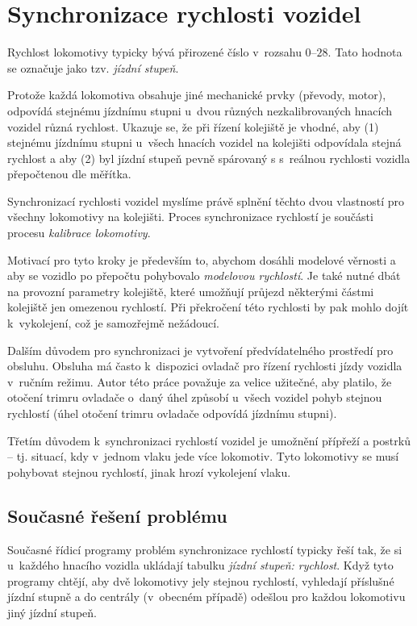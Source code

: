 \section{Synchronizace rychlosti vozidel}
\label{sec:sync-rych}

Rychlost lokomotivy typicky bývá přirozené číslo v~rozsahu $0$--$28$. Tato
hodnota se označuje jako tzv. \textit{jízdní stupeň}.

Protože každá lokomotiva obsahuje jiné mechanické prvky (převody, motor),
odpovídá stejnému jízdnímu stupni u~dvou různých nezkalibrovaných hnacích
vozidel různá rychlost. Ukazuje se, že při řízení kolejiště je vhodné, aby (1)
stejnému jízdnímu stupni u~všech hnacích vozidel na kolejišti odpovídala stejná
rychlost a aby (2) byl jízdní stupeň pevně spárovaný s s~reálnou rychlosti
vozidla přepočtenou dle měřítka.

Synchronizací rychlosti vozidel myslíme právě splnění těchto dvou vlastností
pro všechny lokomotivy na kolejišti. Proces synchronizace rychlostí je součásti
procesu \textit{kalibrace lokomotivy}.

Motivací pro tyto kroky je především to, abychom dosáhli modelové věrnosti a
aby se vozidlo po přepočtu pohybovalo \textit{modelovou rychlostí}. Je také
nutné dbát na provozní parametry kolejiště, které umožňují průjezd některými
částmi kolejiště jen omezenou rychlostí. Při překročení této rychlosti by pak
mohlo dojít k~vykolejení, což je samozřejmě nežádoucí.

Dalším důvodem pro synchronizaci je vytvoření předvídatelného prostředí pro
obsluhu. Obsluha má často k~dispozici ovladač pro řízení rychlosti jízdy
vozidla v~ručním režimu. Autor této práce považuje za velice užitečné, aby
platilo, že otočení trimru ovladače o~daný úhel způsobí u~všech vozidel pohyb
stejnou rychlostí (úhel otočení trimru ovladače odpovídá jízdnímu stupni).

Třetím důvodem k~synchronizaci rychlostí vozidel je umožnění přípřeží a postrků
-- tj.  situací, kdy v~jednom vlaku jede více lokomotiv. Tyto lokomotivy se
musí pohybovat stejnou rychlostí, jinak hrozí vykolejení vlaku.

\subsection{Současné řešení problému}

Současné řídicí programy problém synchronizace rychlostí typicky řeší tak, že
si u~každého hnacího vozidla ukládají tabulku \textit{jízdní stupeň: rychlost}.
Když tyto programy chtějí, aby dvě lokomotivy jely stejnou rychlostí, vyhledají
příslušné jízdní stupně a do centrály (v~obecném případě) odešlou pro každou
lokomotivu jiný jízdní stupeň.

